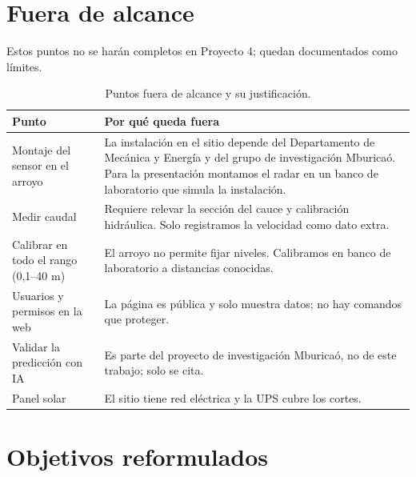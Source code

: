 \documentclass[11pt,a4paper]{article}
\begin{document}
\section{Fuera de alcance}

Estos puntos no se harán completos en Proyecto 4; quedan documentados como
límites.

\begin{table}[H]
    \centering
    \caption{Puntos fuera de alcance y su justificación.}
    \begin{tabularx}{\textwidth}{>{\raggedright\arraybackslash}p{4.2cm}L}
        \toprule
        \textbf{Punto} & \textbf{Por qué queda fuera} \\
        \midrule
        Montaje del sensor en el arroyo & La instalación en el sitio depende
            del Departamento de Mecánica y Energía y del grupo de investigación
            Mburicaó. Para la presentación montamos el radar en un banco de
            laboratorio que simula la instalación. \\
        Medir caudal & Requiere relevar la sección del cauce y calibración
            hidráulica. Solo registramos la velocidad como dato extra. \\
        Calibrar en todo el rango (0,1--40 m) & El arroyo no permite fijar
            niveles. Calibramos en banco de laboratorio a distancias conocidas. \\
        Usuarios y permisos en la web & La página es pública y solo muestra
            datos; no hay comandos que proteger. \\
        Validar la predicción con IA & Es parte del proyecto de investigación
            Mburicaó, no de este trabajo; solo se cita. \\
        Panel solar & El sitio tiene red eléctrica y la UPS cubre los cortes. \\
        \bottomrule
    \end{tabularx}
\end{table}

\section{Objetivos reformulados}
\end{document}
